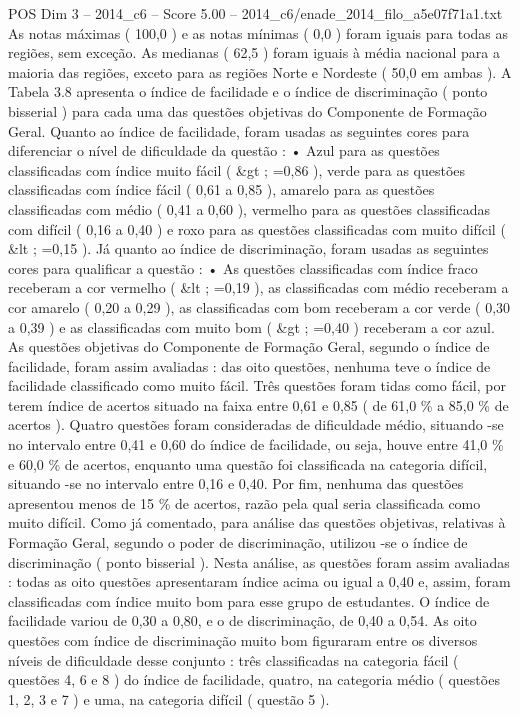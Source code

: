 \begin{textsample}{POS Dim 3 – 2014\_c6 – Score 5.00 – 2014\_c6/enade\_2014\_filo\_a5e07f71a1.txt}
As notas máximas ( 100,0 ) e as notas mínimas ( 0,0 ) foram iguais para todas as regiões, sem exceção.
As medianas ( 62,5 ) foram iguais à média nacional para a maioria das regiões, exceto para as regiões Norte e Nordeste ( 50,0 em ambas ).
A Tabela 3.8 apresenta o índice de facilidade e o índice de discriminação ( ponto bisserial ) para cada uma das questões objetivas do Componente de Formação Geral.
Quanto ao índice de facilidade, foram usadas as seguintes cores para diferenciar o nível de dificuldade da questão : • Azul para as questões classificadas com índice muito fácil ( \&gt ; =0,86 ), verde para as questões classificadas com índice fácil ( 0,61 a 0,85 ), amarelo para as questões classificadas com médio ( 0,41 a 0,60 ), vermelho para as questões classificadas com difícil ( 0,16 a 0,40 ) e roxo para as questões classificadas com muito difícil ( \&lt ; =0,15 ).
Já quanto ao índice de discriminação, foram usadas as seguintes cores para qualificar a questão : • As questões classificadas com índice fraco receberam a cor vermelho ( \&lt ; =0,19 ), as classificadas com médio receberam a cor amarelo ( 0,20 a 0,29 ), as classificadas com bom receberam a cor verde ( 0,30 a 0,39 ) e as classificadas com muito bom ( \&gt ; =0,40 ) receberam a cor azul.
As questões objetivas do Componente de Formação Geral, segundo o índice de facilidade, foram assim avaliadas : das oito questões, nenhuma teve o índice de facilidade classificado como muito fácil.
Três questões foram tidas como fácil, por terem índice de acertos situado na faixa entre 0,61 e 0,85 ( de 61,0 \% a 85,0 \% de acertos ).
Quatro questões foram consideradas de dificuldade médio, situando -se no intervalo entre 0,41 e 0,60 do índice de facilidade, ou seja, houve entre 41,0 \% e 60,0 \% de acertos, enquanto uma questão foi classificada na categoria difícil, situando -se no intervalo entre 0,16 e 0,40.
Por fim, nenhuma das questões apresentou menos de 15 \% de acertos, razão pela qual seria classificada como muito difícil.
Como já comentado, para análise das questões objetivas, relativas à Formação Geral, segundo o poder de discriminação, utilizou -se o índice de discriminação ( ponto bisserial ).
Nesta análise, as questões foram assim avaliadas : todas as oito questões apresentaram índice acima ou igual a 0,40 e, assim, foram classificadas com índice muito bom para esse grupo de estudantes.
O índice de facilidade variou de 0,30 a 0,80, e o de discriminação, de 0,40 a 0,54.
As oito questões com índice de discriminação muito bom figuraram entre os diversos níveis de dificuldade desse conjunto : três classificadas na categoria fácil ( questões 4, 6 e 8 ) do índice de facilidade, quatro, na categoria médio ( questões 1, 2, 3 e 7 ) e uma, na categoria difícil ( questão 5 ).

\end{textsample}
